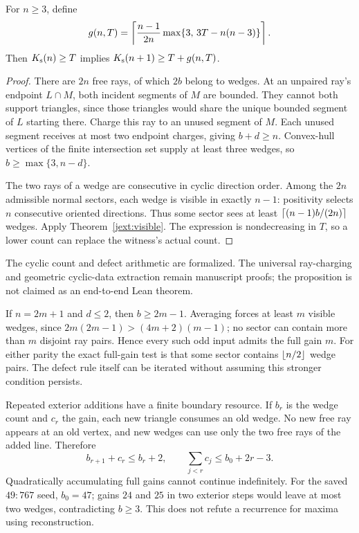 \begin{proposition}
\label{jext:defect}
For $n\ge3$, define
\begin{equation}
 g(n,T)=\left\lceil\frac{n-1}{2n}\max\{3,\,3T-n(n-3)\}\right\rceil.
 \label{jext:gain}
\end{equation}
Then $K_{\mathrm s}(n)\ge T$ implies $K_{\mathrm s}(n+1)\ge T+g(n,T)$.
\end{proposition}
\begin{proof}
There are $2n$ free rays, of which $2b$ belong to wedges.  At an unpaired
ray's endpoint $L\cap M$, both incident segments of $M$ are bounded.
They cannot both support triangles, since those triangles would share
the unique bounded segment of $L$ starting there.  Charge this ray to
an unused segment of $M$.  Each unused segment receives at most two
endpoint charges, giving $b+d\ge n$.  Convex-hull vertices of the finite
intersection set supply at least three wedges, so $b\ge\max\{3,n-d\}$.

The two rays of a wedge are consecutive in cyclic direction order.
Among the $2n$ admissible normal sectors, each wedge is visible in
exactly $n-1$: positivity selects $n$ consecutive oriented directions.
Thus some sector sees at least $\left\lceil(n-1)b/(2n)\right\rceil$ wedges.  Apply
Theorem~\ref{jext:visible}.  The expression is nondecreasing in $T$,
so a lower count can replace the witness's actual count.
\end{proof}
The cyclic count and defect arithmetic are formalized.  The universal
ray-charging and geometric cyclic-data extraction remain manuscript
proofs; the proposition is not claimed as an end-to-end Lean theorem.

If $n=2m+1$ and $d\le2$, then $b\ge2m-1$.  Averaging forces at least
$m$ visible wedges, since
$2m(2m-1)>(4m+2)(m-1)$; no sector can contain more than $m$ disjoint
ray pairs.  Hence every such odd input admits the full gain $m$.
For either parity the exact full-gain test is that some sector contains
$\left\lfloor n/2\right\rfloor$ wedge pairs.  The defect rule itself can be iterated
without assuming this stronger condition persists.

Repeated exterior additions have a finite boundary resource.  If $b_r$
is the wedge count and $c_r$ the gain, each new triangle consumes an
old wedge.  No new free ray appears at an old vertex, and new wedges
can use only the two free rays of the added line.  Therefore
\begin{equation}
 b_{r+1}+c_r\le b_r+2,\qquad
 \sum_{j<r}c_j\le b_0+2r-3.
 \label{jext:budget}
\end{equation}
Quadratically accumulating full gains cannot continue indefinitely.
For the saved $49:767$ seed, $b_0=47$; gains $24$ and $25$ in two
exterior steps would leave at most two wedges, contradicting $b\ge3$.
This does not refute a recurrence for maxima using reconstruction.

